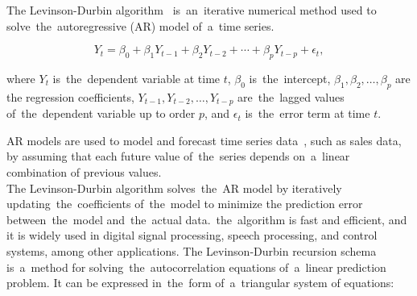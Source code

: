 The Levinson-Durbin algorithm~\cite{Levinson} is~an~iterative numerical method used to solve~the~autoregressive
(AR) model of~a~time series.

\begin{equation}
    \label{eq:levinson}
    Y_t = \beta_0 + \beta_1 Y_{t-1} + \beta_2 Y_{t-2} + \cdots + \beta_p Y_{t-p} + \epsilon_t,
\end{equation}

where $Y_t$ is~the~dependent variable at time $t$, $\beta_0$ is~the~intercept, $\beta_1, \beta_2, \dots, \beta_p$ are the
regression coefficients, $Y_{t-1}, Y_{t-2}, \dots, Y_{t-p}$ are~the~lagged values of~the~dependent variable up to
order $p$, and $\epsilon_t$ is~the~error term at time $t$.

AR models are used to model and forecast time series data~\cite{Durbin}, such as sales data, by assuming that each
future value of~the~series depends on~a~linear combination of previous values.
\\
The Levinson-Durbin algorithm solves~the~AR model by iteratively updating~the~coefficients of~the~model to minimize
the prediction error between~the~model and~the~actual data.~the~algorithm is fast and efficient, and it is widely
used in digital signal processing, speech processing, and control systems, among other applications.
The Levinson-Durbin recursion schema is~a~method for solving~the~autocorrelation equations of~a~linear
prediction problem. It can be expressed in~the~form of~a~triangular system of equations:

